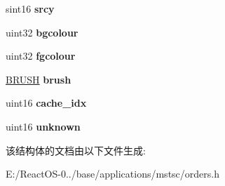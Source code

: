 \begin{DoxyCompactItemize}
sint16 {\bfseries srcy}
\item 
\mbox{\label{struct___t_r_i_b_l_t___o_r_d_e_r_a733b5f5b9c6fa540336bb1c11955619b}} 
uint32 {\bfseries bgcolour}
\item 
\mbox{\label{struct___t_r_i_b_l_t___o_r_d_e_r_ae551085e68959aaeb8cf2c22204cd595}} 
uint32 {\bfseries fgcolour}
\item 
\mbox{\label{struct___t_r_i_b_l_t___o_r_d_e_r_a2507787c82a9749fd3cce760fe7d9d7c}} 
\hyperlink{class_b_r_u_s_h}{B\+R\+U\+SH} {\bfseries brush}
\item 
\mbox{\label{struct___t_r_i_b_l_t___o_r_d_e_r_a103c1ed67201611d6db0806b05774176}} 
uint16 {\bfseries cache\+\_\+idx}
\item 
\mbox{\label{struct___t_r_i_b_l_t___o_r_d_e_r_add8d141aece091733a29d08487aff7fe}} 
uint16 {\bfseries unknown}
\end{DoxyCompactItemize}


该结构体的文档由以下文件生成\+:\begin{DoxyCompactItemize}
\item 
E\+:/\+React\+O\+S-\/0../base/applications/mstsc/orders.\+h\end{DoxyCompactItemize}
